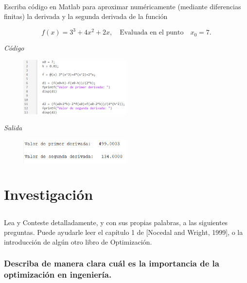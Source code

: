 \documentclass[12pt,oneside]{book}
\begin{document}
\section[Ejercicio]{}
{\large Escriba código en Matlab para aproximar numéricamente (mediante diferencias finitas) la derivada y la segunda derivada de la función}

\begin{equation*}
    f(x)=3^3+4x^2+2x, \quad \text{Evaluada en el punto} \quad x_0=7.
\end{equation*}

\textit{Código}

\begin{figure}[H]
    \centering
    \includegraphics[width = 0.5\textwidth]{figura3}
\end{figure}

\textit{Salida}

\begin{figure}[H]
    \centering
    \includegraphics[width = 0.5\textwidth]{figura4}
\end{figure}



\chapter{Investigación}

\section[Ejercicio]{}

{\large Lea y Conteste detalladamente, y con sus propias palabras, a las siguientes
preguntas. Puede ayudarle leer el capítulo 1 de [Nocedal and Wright, 1999],
o la introducción de algún otro libro de Optimización.
}

\subsection{Describa de manera clara cuál es la importancia de la optimización
en ingeniería.}
\end{document}
